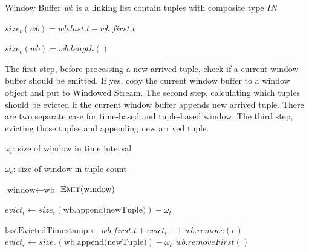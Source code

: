 Window Buffer \textit{wb} is a linking list contain tuples with composite type $IN$




$size_{t}(wb) = wb.last.t - wb.first.t$

$size_c(wb) = wb.length()$


\begin{algorithm}
\caption{Process new arrived tuple}
\label{algorithm:processNewTuple}
The first step, before processing a new arrived tuple, check if a current window buffer should be emitted. If yes, copy the current window buffer to a window object and put to Windowed Stream. The second step, calculating which tuples should be evicted if the current window buffer appends new arrived tuple. There are two separate case for time-based and tuple-based window. The third step, evicting those tuples and appending new arrived tuple.


\algrenewcommand{}
\algrenewcommand{}
  \begin{algorithmic}[1]
  	
  			{$\omega_t$: size of window in time interval }
  			
  			{$\omega_c$: size of window in tuple count }
    
     
    		\State $\textrm{window} \gets \textrm{wb}$
    		\State $\textsc{Emit}(\textrm{window})$ 
    \EndIf
    
    		\State $ evict_t \gets size_t (\textrm{wb.append(newTuple)}) - \omega_t$
    
    		 
    			\State $ \textrm{lastEvictedTimestamp} \gets wb.first.t + evict_t - 1$
    					\State $wb.remove(e)$
    				\EndIf
    			\EndFor
    		\EndIf
    \Else {}
    		\State $evict_c \gets size_c(\textrm{wb.append(newTuple)}) - \omega_c$
    		 
    				\State $wb.removeFirst()$
    			\EndFor
    		\EndIf
    \EndIf
    

\end{algorithmic}
\end{algorithm}
